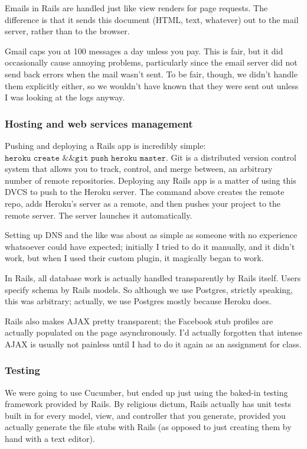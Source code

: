 \documentclass[11pt,a4paper]{article}
\begin{document}
Emails in Rails are handled just like view renders for page requests. The difference is that it sends this document (HTML, text, whatever) out to the mail server, rather than to the browser.

Gmail caps you at 100 messages a day unless you pay. This is fair, but it did occasionally cause annoying problems, particularly since the email server did not send back errors when the mail wasn't sent. To be fair, though, we didn't handle them explicitly either, so we wouldn't have known that they were sent out unless I was looking at the logs anyway.

\subsubsection{Hosting and web services management}

Pushing and deploying a Rails app is incredibly simple: $\texttt{heroku create \&\& git push heroku}$ $\texttt{master}$. Git is a distributed version control system that allows you to track, control, and merge between, an arbitrary number of remote repositories. Deploying any Rails app is a matter of using this DVCS to push to the Heroku server. The command above creates the remote repo, adds Heroku's server as a remote, and then pushes your project to the remote server. The server launches it automatically.

Setting up DNS and the like was about as simple as someone with no experience whatsoever could have expected; initially I tried to do it manually, and it didn't work, but when I used their custom plugin, it magically began to work.

In Rails, all database work is actually handled transparently by Rails itself. Users specify schema by Rails models. So although we use Postgres, strictly speaking, this was arbitrary; actually, we use Postgres mostly because Heroku does.

Rails also makes AJAX pretty transparent; the Facebook stub profiles are actually populated on the page asynchronously. I'd actually forgotten that intense AJAX is usually not painless until I had to do it again as an assignment for class.

\subsubsection{Testing}

We were going to use Cucumber, but ended up just using the baked-in testing framework provided by Rails. By religious dictum, Rails actually has unit tests built in for every model, view, and controller that you generate, provided you actually generate the file stubs with Rails (as opposed to just creating them by hand with a text editor).
\end{document}
